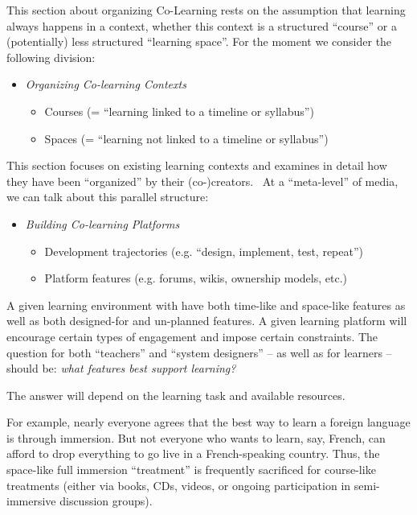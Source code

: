 This section about organizing Co-Learning rests on the assumption that
learning always happens in a context, whether this context is a
structured ``course'' or a (potentially) less structured ``learning
space''. For the moment we consider the following division:

\begin{itemize}
\itemsep1pt\parskip0pt
\item
  \emph{Organizing Co-learning Contexts}

  \begin{itemize}
  \itemsep1pt\parskip0pt
  \item
    Courses (= ``learning linked to a timeline or syllabus'')
  \item
    Spaces (= ``learning not linked to a timeline or syllabus'')
  \end{itemize}
\end{itemize}

This section focuses on existing learning contexts and examines in
detail how they have been ``organized'' by their (co-)creators.~ At a
``meta-level'' of media, we can talk about this parallel structure:

\begin{itemize}
\itemsep1pt\parskip0pt
\item
  \emph{Building Co-learning Platforms}

  \begin{itemize}
  \itemsep1pt\parskip0pt
  \item
    Development trajectories (e.g. ``design, implement, test, repeat'')
  \item
    Platform features (e.g. forums, wikis, ownership models, etc.)
  \end{itemize}
\end{itemize}

A given learning environment with have both time-like and space-like
features as well as both designed-for and un-planned features. A given
learning platform will encourage certain types of engagement and impose
certain constraints. The question for both ``teachers'' and ``system
designers'' -- as well as for learners -- should be: \emph{what features
best support learning?}

The answer will depend on the learning task and available resources.

For example, nearly everyone agrees that the best way to learn a foreign
language is through immersion. But not everyone who wants to learn, say,
French, can afford to drop everything to go live in a French-speaking
country. Thus, the space-like full immersion ``treatment'' is frequently
sacrificed for course-like treatments (either via books, CDs, videos, or
ongoing participation in semi-immersive discussion groups).

